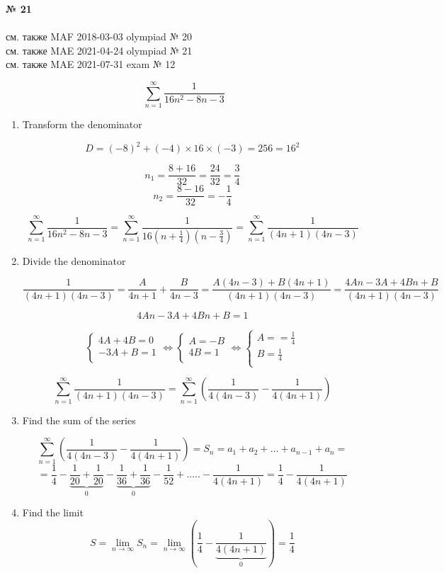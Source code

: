 \documentclass{article}
\begin{document}
\textbf{№ 21} 
\\
\\ см. также {\color{blue}MAF} 2018-03-03 olympiad № 20
\\ см. также {\color{red}MAE} 2021-04-24 olympiad № 21
\\ см. также {\color{red}MAE} 2021-07-31 exam № 12

$$ \sum_{n=1}^{\infty} \frac{1}{16n^2-8n-3} $$

\begin{enumerate}

\item Transform the denominator

$$ D = (-8)^2 + (-4)\times16\times(-3)=256=16^2 $$

$$ n_1 = \frac{8+16}{32}=\frac{24}{32} = \frac{3}{4} $$
$$ n_2 = \frac{8-16}{32}=-\frac{1}{4} $$

$$\sum_{n=1}^{\infty} \frac{1}{16n^2-8n-3} 
= \sum_{n=1}^{\infty} \frac{1}{16(n+\frac{1}{4})(n-\frac{3}{4})} 
= \sum_{n=1}^{\infty} \frac{1}{(4n+1)(4n-3)}$$

\item Divide the denominator

$$\frac{1}{(4n+1)(4n-3)} 
= \frac{A}{4n+1} + \frac{B}{4n-3} 
= \frac{A(4n-3)+B(4n+1)}{(4n+1)(4n-3)} 
= \frac{4An-3A+4Bn+B}{(4n+1)(4n-3)}$$

$$4An-3A+4Bn+B = 1$$

$$
\left\{
  \begin{array}{ccc}
    4A + 4B = 0 \\
    -3A+B = 1 \\
  \end{array}\Leftrightarrow
\right.
\left\{
  \begin{array}{ccc}
    A = -B \\
    4B = 1 \\
  \end{array}\Leftrightarrow
\right.
\left\{
  \begin{array}{ccc}
    A = =\frac{1}{4} \\
    B = \frac{1}{4} \\
  \end{array}
\right.
$$

$$ \sum_{n=1}^{\infty} \frac{1}{(4n+1)(4n-3)} = 
\sum_{n=1}^{\infty} \left(\frac{1}{4(4n-3)} - \frac{1}{4(4n+1)}\right) $$

\item Find the sum of the series

$$ \sum_{n=1}^{\infty} \left(\frac{1}{4(4n-3)} - \frac{1}{4(4n+1)}\right) 
= S_n = a_1+a_2+...+a_{n-1}+a_n = $$
$$ = \frac{1}{4} - \underbrace{\frac{1}{20} + \frac{1}{20}}_{0} - \underbrace{\frac{1}{36} + \frac{1}{36}}_{0} - \frac{1}{52} + ..... - \frac{1}{4(4n+1)} = \frac{1}{4} - \frac{1}{4(4n+1)}$$

\item Find the limit
$$S = \lim_{n\to\infty} S_n 
= \lim_{n\to\infty} \left(\frac{1}{4} - \underbrace{\frac{1}{4(4n+1)}}_{0}\right) 
= \frac{1}{4} $$


\end{enumerate}
\end{document}
